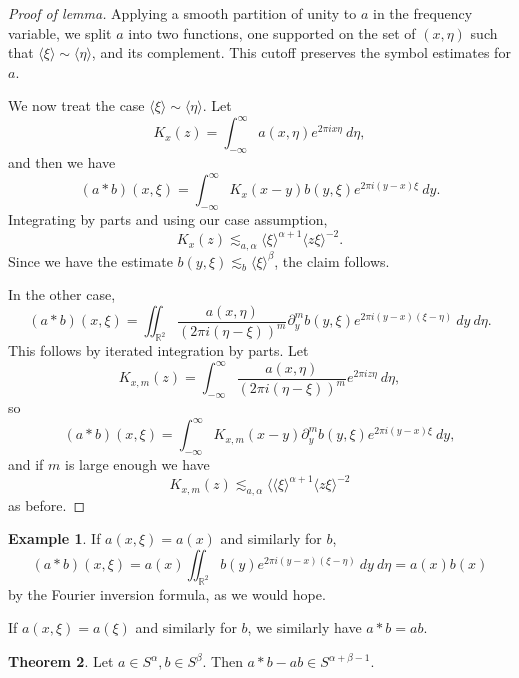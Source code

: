 \documentclass[12pt]{report}
\newcommand{\RR}{\mathbb{R}}
\theoremstyle{definition}
\newtheorem{theorem}{Theorem}[chapter]
\newtheorem{example}[theorem]{Example}
\begin{document}
\begin{proof}[Proof of lemma]
Applying a smooth partition of unity to $a$ in the frequency variable, we split $a$ into two functions, one supported on the set of $(x, \eta)$ such that $\langle \xi \rangle \sim \langle \eta \rangle$, and its complement.
This cutoff preserves the symbol estimates for $a$.

We now treat the case $\langle \xi \rangle \sim \langle \eta \rangle$. Let
$$K_x(z) = \int_{-\infty}^\infty a(x, \eta)e^{2\pi ix\eta} ~d\eta,$$
and then we have
$$(a*b)(x, \xi) = \int_{-\infty}^\infty K_x(x - y)b(y, \xi) e^{2\pi i(y-x)\xi } ~dy.$$
Integrating by parts and using our case assumption,
$$K_x(z) \lesssim_{a,\alpha} \langle \xi\rangle^{\alpha + 1} \langle z\xi \rangle^{-2}.$$
Since we have the estimate $b(y, \xi) \lesssim_b \langle \xi \rangle^\beta$, the claim follows.

In the other case,
$$(a*b)(x, \xi) = \iint_{\RR^2} \frac{a(x, \eta)}{(2\pi i(\eta - \xi))^m} \partial_y^m b(y, \xi) e^{2\pi i (y-x)(\xi - \eta)} ~dy~d\eta.$$
This follows by iterated integration by parts. Let
$$K_{x,m}(z) = \int_{-\infty}^\infty\frac{a(x, \eta)}{(2\pi i(\eta - \xi))^m}e^{2\pi iz\eta}~d\eta,$$
so
$$(a*b)(x, \xi) = \int_{-\infty}^\infty K_{x,m}(x-y) \partial_y^m b(y,\xi) e^{2\pi i(y-x)\xi}~dy,$$
and if $m$ is large enough we have
$$K_{x,m}(z) \lesssim_{a,\alpha} \langle \langle \xi\rangle^{\alpha + 1} \langle z\xi \rangle^{-2}$$
as before.
\end{proof}
\begin{example}
If $a(x,\xi) = a(x)$ and similarly for $b$,
$$(a*b)(x, \xi) = a(x)\iint_{\RR^2} b(y)e^{2\pi i(y-x)(\xi-\eta)} ~dy~d\eta = a(x)b(x)$$
by the Fourier inversion formula, as we would hope.

If $a(x, \xi) = a(\xi)$ and similarly for $b$, we similarly have $a*b = ab$.
\end{example}
\begin{theorem}
Let $a \in S^\alpha, b \in S^\beta$. Then $a*b-ab \in S^{\alpha + \beta - 1}$.
\end{theorem}
\end{document}
